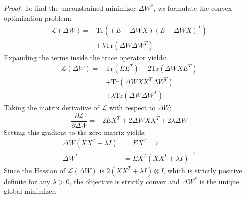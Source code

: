 \documentclass{article}
\theoremstyle{plain}
\theoremstyle{definition}
\theoremstyle{remark}
\begin{document}
\begin{proof}[Proof]
To find the unconstrained minimizer $\Delta W^*$, we formulate the convex optimization problem:
\begin{equation}
  \begin{aligned}
    \mathcal{L}(\Delta W) = & \text{Tr}\left((E - \Delta W X)(E - \Delta W X)^T\right) \\
    & + \lambda \text{Tr}(\Delta W \Delta W^T)
  \end{aligned}
\end{equation}
Expanding the terms inside the trace operator yields:
\begin{equation}
  \begin{aligned}
    \mathcal{L}(\Delta W) = & \text{Tr}(E E^T) - 2\text{Tr}(\Delta W X E^T) \\
    & + \text{Tr}(\Delta W X X^T \Delta W^T) \\
    & + \lambda \text{Tr}(\Delta W \Delta W^T)
  \end{aligned}
\end{equation}
Taking the matrix derivative of $\mathcal{L}$ with respect to $\Delta W$:
\begin{equation}
  \frac{\partial \mathcal{L}}{\partial \Delta W} = -2 E X^T + 2 \Delta W X X^T + 2 \lambda \Delta W
\end{equation}
Setting this gradient to the zero matrix yields:
\begin{equation}
  \begin{aligned}
    \Delta W (X X^T + \lambda I) & = E X^T \implies \\
    \Delta W^* & = E X^T (X X^T + \lambda I)^{-1}
  \end{aligned}
\end{equation}
Since the Hessian of $\mathcal{L}(\Delta W)$ is $2 (X X^T + \lambda I) \otimes I$, which is strictly positive definite for any $\lambda > 0$, the objective is strictly convex and $\Delta W^*$ is the unique global minimizer.


\end{proof}
\end{document}

